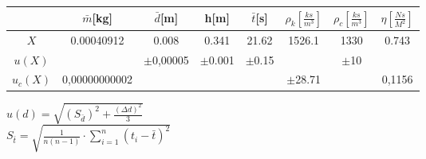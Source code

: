 \documentclass{article}
\begin{document}
\begin{tabular}{|c|c|c|c|c|c|c|c|}
    \hline
    \cellcolor{cyan!50}&\cellcolor{cyan!50}$\bar{m}$[kg]&\cellcolor{cyan!50}$\bar{d}$[m]&\cellcolor{cyan!50}h[m]&\cellcolor{cyan!50}$\bar{t}$[s]&\cellcolor{cyan!50}$\rho_{k}\left[\frac{ks}{m^{3}}\right]$&\cellcolor{cyan!50}$\rho_{c}$$\left[\frac{ks}{m^{3}}\right]$&\cellcolor{cyan!50}$\eta\left[\frac{Ns}{M^{2}}\right]$\\
    \hline 
    \cellcolor{cyan!50}$X$ &\cellcolor{cyan!50}0.00040912&\cellcolor{cyan!50}0.008&\cellcolor{cyan!50}0.341&\cellcolor{cyan!50}21.62&\cellcolor{cyan!50}1526.1&\cellcolor{cyan!50}1330&\cellcolor{cyan!50}0.743\\\hline
    \cellcolor{cyan!50}$u(X)$&\cellcolor{gray}&\cellcolor{cyan!50}$\pm$0,00005&\cellcolor{cyan!50}$\pm$0.001&\cellcolor{cyan!50}$\pm$0.15&\cellcolor{gray}&\cellcolor{cyan!50}$\pm$10&\cellcolor{gray}\\\hline
    \cellcolor{cyan!50}$u_{c}(X)$&\cellcolor{cyan!50}0,00000000002&\cellcolor{gray}&\cellcolor{gray}&\cellcolor{gray}&\cellcolor{cyan!50}$\pm$28.71&\cellcolor{gray}&\cellcolor{cyan!50}0,1156\\\hline
\end{tabular}


$u(d)=\sqrt{\left(S_{\bar{d}}\right)^{2}+\frac{(\Delta d)^{2}}{3}}$\\
$S_{\bar{t}}=\sqrt{\frac{1}{n(n-1)}\cdot\sum^{n}_{i=1}\left(t_{i}-\bar{t}\right)^{2}}$\\
\end{document}
